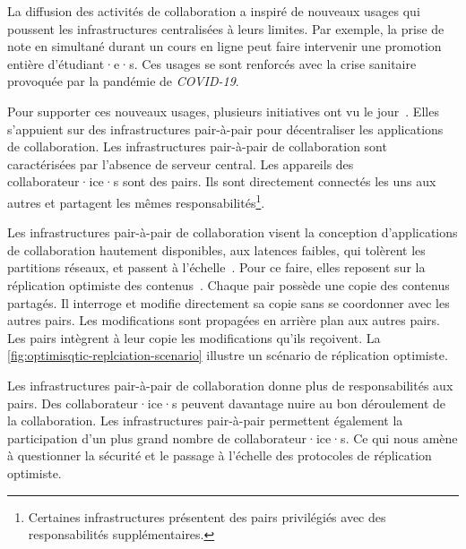 La diffusion des activités de collaboration a inspiré de nouveaux usages qui poussent les infrastructures centralisées à leurs limites.
Par exemple, la prise de note en simultané durant un cours en ligne peut faire intervenir une promotion entière d'étudiant·e·s.
Ces usages se sont renforcés avec la crise sanitaire provoquée par la pandémie de \emph{COVID-19}.

Pour supporter ces nouveaux usages, plusieurs initiatives ont vu le jour~\autocite{benet2014ipfs,wood2014ethereum,mansour2016demonstration}.
Elles s'appuient sur des infrastructures pair-à-pair pour décentraliser les applications de collaboration.
Les infrastructures pair-à-pair de collaboration sont caractérisées par l'absence de serveur central.
Les appareils des collaborateur·ice·s sont des pairs.
Ils sont directement connectés les uns aux autres et partagent les mêmes responsabilités\footnote{Certaines infrastructures présentent des pairs privilégiés avec des responsabilités supplémentaires.%
}.

Les infrastructures pair-à-pair de collaboration visent la conception d'applications de collaboration hautement disponibles, aux latences faibles, qui tolèrent les partitions réseaux, et passent à l'échelle~\autocite{rodrigues2010peer}.
Pour ce faire, elles reposent sur la réplication optimiste des contenus~\autocite{saito_2005_optimisticreplication}.
Chaque pair possède une copie des contenus partagés.
Il interroge et modifie directement sa copie sans se coordonner avec les autres pairs.
Les modifications sont propagées en arrière plan aux autres pairs.
Les pairs intègrent à leur copie les modifications qu'ils reçoivent.
La \autoref{fig:optimisqtic-replciation-scenario} illustre un scénario de réplication optimiste.


Les infrastructures pair-à-pair de collaboration donne plus de responsabilités aux pairs.
Des collaborateur·ice·s peuvent davantage nuire au bon déroulement de la collaboration.
Les infrastructures pair-à-pair permettent également la participation d'un plus grand nombre de collaborateur·ice·s.
Ce qui nous amène à questionner la sécurité et le passage à l'échelle des protocoles de réplication optimiste.


